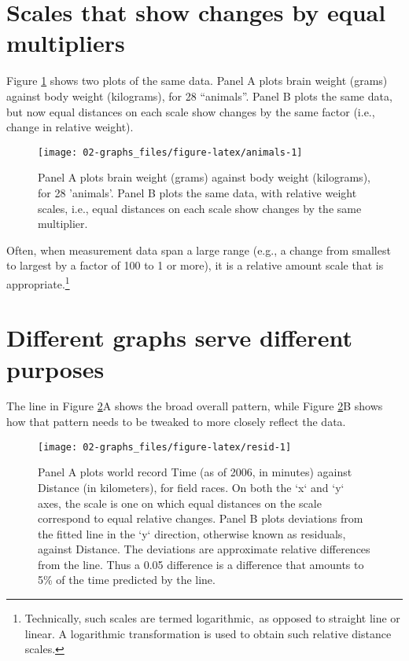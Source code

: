 \documentclass[
  10ptls,
  b5paper]{book}
\begin{document}
\hypertarget{scales-that-show-changes-by-equal-multipliers}{%
\section{Scales that show changes by equal multipliers}\label{scales-that-show-changes-by-equal-multipliers}}

Figure \ref{fig:animals} shows two plots of the same data.
Panel A plots brain weight (grams) against body weight (kilograms),
for 28 ``animals''. Panel B plots the same data, but now equal distances
on each scale show changes by the same factor (i.e., change in relative
weight).

\begin{figure}[H]

{\centering \texttt{[image: 02-graphs\_files/figure-latex/animals-1]} 

}

\caption{Panel A plots brain weight (grams) against body weight 
(kilograms), for 28 'animals'.  Panel B plots the same data, 
with relative weight scales, i.e., equal distances on each scale 
show changes by the same multiplier.}\label{fig:animals}
\end{figure}

Often, when measurement data span a large range (e.g., a change
from smallest to largest by a factor of 100 to 1 or more),
it is a relative amount scale that is appropriate.\footnote{Technically,
  such scales are termed logarithmic,~as opposed to straight
  line or linear. A logarithmic transformation is used to
  obtain such relative distance scales.}

\hypertarget{track}{%
\section{Different graphs serve different purposes}\label{track}}

The line in Figure \ref{fig:resid}A shows the broad overall
pattern, while Figure \ref{fig:resid}B shows how that pattern
needs to be tweaked to more closely reflect the data.

\begin{figure}[H]

{\centering \texttt{[image: 02-graphs\_files/figure-latex/resid-1]} 

}

\caption{Panel A plots world record Time (as of 2006, in minutes)
against Distance (in kilometers), for field races.  On both the
`x` and `y` axes, the scale is one on which equal distances on 
the scale correspond to equal relative changes.  Panel B plots
deviations from the fitted line in the `y` direction, otherwise
known as residuals, against Distance. The deviations are
approximate relative differences from the line.  Thus a 0.05
difference is a difference that amounts to 5\% of the time
predicted by the line.}\label{fig:resid}
\end{figure}
\end{document}
